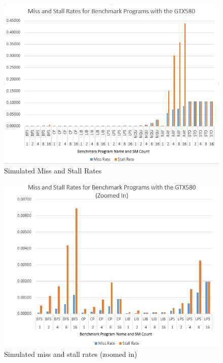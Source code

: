\begin{figure}
\centering
\includegraphics[width=\columnwidth]{graphics/miss_stalls_benchmarks.png}
\caption{Simulated Miss and Stall Rates
}
\label{fig:missStalls}
\end{figure}

\begin{figure}
\centering
\includegraphics[width=\columnwidth]{graphics/miss_stalls_benchmarks_zoomed.png}
\caption{Simulated miss and stall rates (zoomed in) }
\label{fig:missStallsZoomed}
\end{figure}

